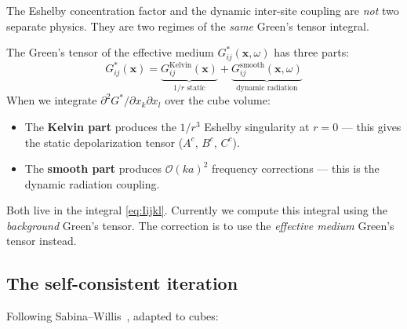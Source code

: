 \documentclass[11pt,a4paper]{article}
\newcommand{\order}{\mathcal{O}}
\begin{document}
The Eshelby concentration factor and the dynamic inter-site coupling
are \emph{not} two separate physics.  They are two regimes of the
\emph{same} Green's tensor integral.

The Green's tensor of the effective medium $G^*_{ij}(\bm{x}, \omega)$
has three parts:
\begin{equation}\label{eq:Gdecomp}
  G^*_{ij}(\bm{x}) = \underbrace{G^{\text{Kelvin}}_{ij}(\bm{x})}_{1/r\text{ static}}
    + \underbrace{G^{\text{smooth}}_{ij}(\bm{x}, \omega)}_{\text{dynamic radiation}}
\end{equation}
When we integrate $\partial^2 G^*/\partial x_k \partial x_l$ over the
cube volume:
\begin{itemize}[nosep]
  \item The \textbf{Kelvin part} produces the $1/r^3$ Eshelby
    singularity at $r=0$ --- this gives the static
    depolarization tensor ($A^c$, $B^c$, $C^c$).
  \item The \textbf{smooth part} produces $\order(ka)^2$ frequency
    corrections --- this is the dynamic radiation coupling.
\end{itemize}
Both live in the integral \eqref{eq:Iijkl}.  Currently we compute
this integral using the \emph{background} Green's tensor.  The
correction is to use the \emph{effective medium} Green's tensor
instead.

\subsection{The self-consistent iteration}

Following Sabina--Willis~\cite{sabina1993}, adapted to cubes:
\end{document}
